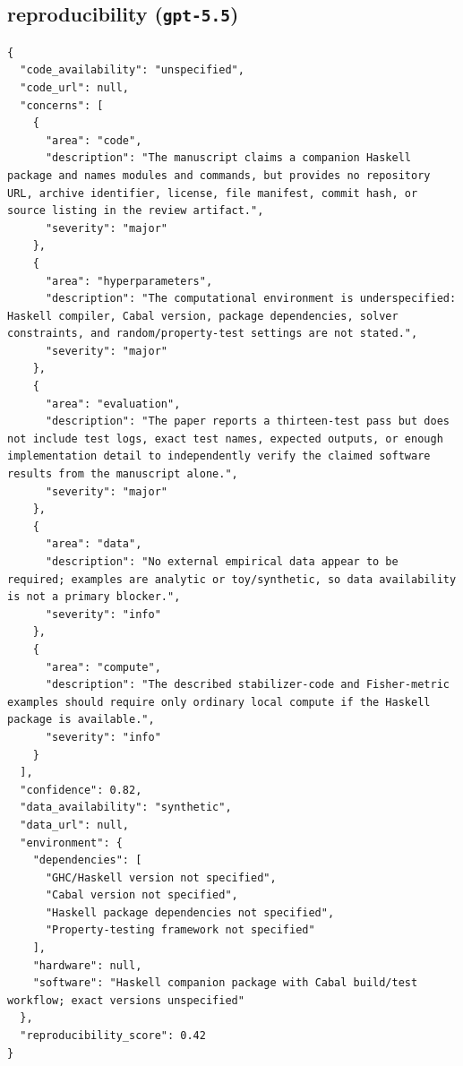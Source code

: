 \documentclass[11pt]{article}
\begin{document}
\subsection*{reproducibility (\texttt{gpt-5.5})}
\begin{verbatim}
{
  "code_availability": "unspecified",
  "code_url": null,
  "concerns": [
    {
      "area": "code",
      "description": "The manuscript claims a companion Haskell package and names modules and commands, but provides no repository URL, archive identifier, license, file manifest, commit hash, or source listing in the review artifact.",
      "severity": "major"
    },
    {
      "area": "hyperparameters",
      "description": "The computational environment is underspecified: Haskell compiler, Cabal version, package dependencies, solver constraints, and random/property-test settings are not stated.",
      "severity": "major"
    },
    {
      "area": "evaluation",
      "description": "The paper reports a thirteen-test pass but does not include test logs, exact test names, expected outputs, or enough implementation detail to independently verify the claimed software results from the manuscript alone.",
      "severity": "major"
    },
    {
      "area": "data",
      "description": "No external empirical data appear to be required; examples are analytic or toy/synthetic, so data availability is not a primary blocker.",
      "severity": "info"
    },
    {
      "area": "compute",
      "description": "The described stabilizer-code and Fisher-metric examples should require only ordinary local compute if the Haskell package is available.",
      "severity": "info"
    }
  ],
  "confidence": 0.82,
  "data_availability": "synthetic",
  "data_url": null,
  "environment": {
    "dependencies": [
      "GHC/Haskell version not specified",
      "Cabal version not specified",
      "Haskell package dependencies not specified",
      "Property-testing framework not specified"
    ],
    "hardware": null,
    "software": "Haskell companion package with Cabal build/test workflow; exact versions unspecified"
  },
  "reproducibility_score": 0.42
}
\end{verbatim}
\end{document}
